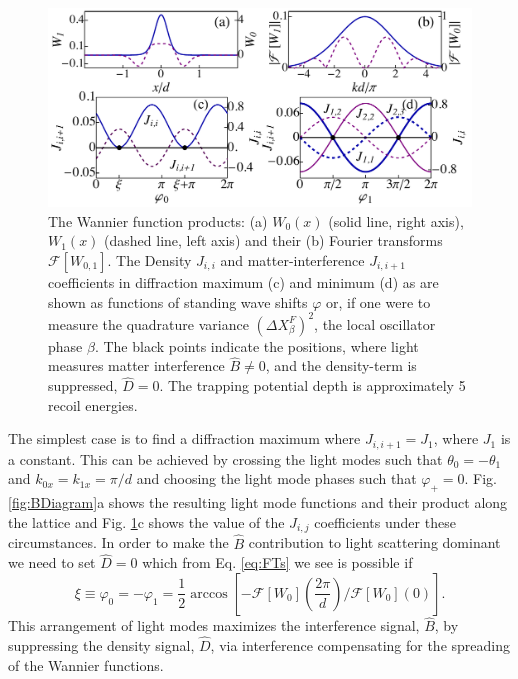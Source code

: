 \begin{figure}[hbtp!]
  \centering
  \includegraphics[width=\linewidth]{WF_S}
  \caption[Wannier Function Products]{The Wannier function products:
    (a) $W_0(x)$ (solid line, right axis), $W_1(x)$ (dashed line, left
    axis) and their (b) Fourier transforms $\mathcal{F}[W_{0,1}]$. The
    Density $J_{i,i}$ and matter-interference $J_{i,i+1}$ coefficients
    in diffraction maximum (c) and minimum (d) as are shown as
    functions of standing wave shifts $\varphi$ or, if one were to
    measure the quadrature variance $(\Delta X^F_\beta)^2$, the local
    oscillator phase $\beta$. The black points indicate the positions,
    where light measures matter interference $\hat{B} \ne 0$, and the
    density-term is suppressed, $\hat{D} = 0$. The trapping potential
    depth is approximately 5 recoil energies.}
  \label{fig:WannierProducts}
\end{figure}

The simplest case is to find a diffraction maximum where
$J_{i,i+1} = J_1$, where $J_1$ is a constant. This can be achieved by
crossing the light modes such that $\theta_0 = -\theta_1$ and
$k_{0x} = k_{1x} = \pi/d$ and choosing the light mode phases such that
$\varphi_+ = 0$. Fig. \ref{fig:BDiagram}a shows the resulting light
mode functions and their product along the lattice and
Fig. \ref{fig:WannierProducts}c shows the value of the $J_{i,j}$
coefficients under these circumstances. In order to make the $\hat{B}$
contribution to light scattering dominant we need to set $\hat{D} = 0$
which from Eq. \eqref{eq:FTs} we see is possible if
\begin{equation}
  \xi \equiv \varphi_0 = -\varphi_1 =
  \frac{1}{2}\arccos[-\mathcal{F}[W_0]\left(\frac{2\pi}{d}\right)/\mathcal{F}[W_0](0)].
\end{equation}
This arrangement of light modes maximizes the interference signal,
$\hat{B}$, by suppressing the density signal, $\hat{D}$, via
interference compensating for the spreading of the Wannier functions.

